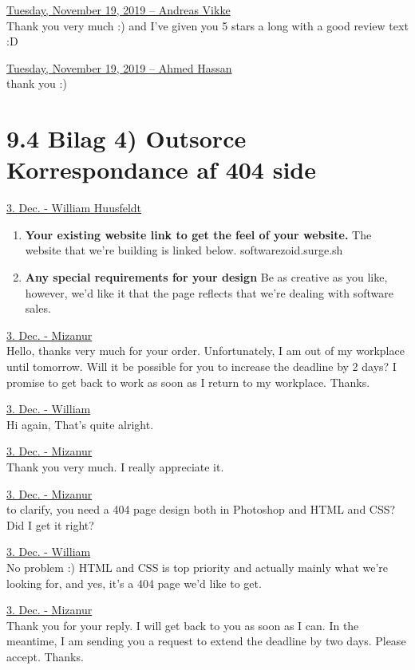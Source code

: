 \documentclass[11pt]{report}
\begin{document}
\noindent\underline{Tuesday, November 19, 2019 – Andreas Vikke}\\
\noindent Thank you very much :) and I've given you 5 stars a long with a good review text :D

\noindent\underline{Tuesday, November 19, 2019 – Ahmed Hassan}\\
\noindent thank you :)


\newpage
\section*{9.4 Bilag 4) Outsorce Korrespondance af 404 side}

\noindent\underline{3. Dec. - William Huusfeldt}
\begin{enumerate}
\item \textbf{Your existing website link to get the feel of your website.}
The website that we're building is linked below.
softwarezoid.surge.sh
\item \textbf{Any special requirements for your design}
Be as creative as you like, however, we'd like it that the page reflects that we're dealing with software sales.
\end{enumerate}

\noindent\underline{3. Dec. - Mizanur}\\
\noindent Hello, thanks very much for your order. Unfortunately, I am out of my workplace until tomorrow. Will it be possible for you to increase the deadline by 2 days? I promise to get back to work as soon as I return to my workplace. Thanks.

\noindent\underline{3. Dec. - William}\\
\noindent Hi again, That's quite alright.

\noindent\underline{3. Dec. - Mizanur}\\
\noindent Thank you very much. I really appreciate it.

\noindent\underline{3. Dec. - Mizanur}\\
\noindent to clarify, you need a 404 page design both in Photoshop and HTML and CSS? 
\noindent Did I get it right?

\noindent\underline{3. Dec. - William}\\
\noindent No problem :)
\noindent HTML and CSS is top priority and actually mainly what we're looking for, and yes, it's a 404 page we'd like to get.

\noindent\underline{3. Dec. - Mizanur}\\
\noindent Thank you for your reply. I will get back to you as soon as I can. In the meantime, I am sending you a request to extend the deadline by two days. Please accept. Thanks.
\end{document}
